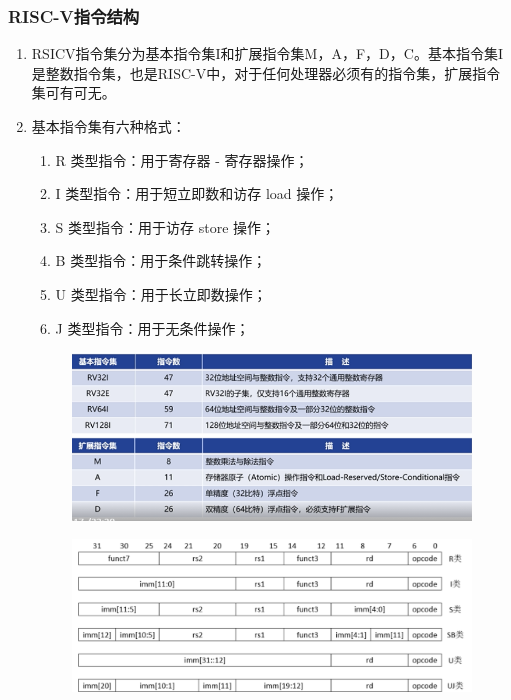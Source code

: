\documentclass[a4paper, 14pt, oneside]{book} %
\numberwithin{equation}{subsection}
\begin{document}
			\subsubsection{RISC-V指令结构}
				\begin{enumerate}
					\item 
						RSICV指令集分为基本指令集I和扩展指令集M，A，F，D，C。基本指令集I是整数指令集，也是RISC-V中，对于任何处理器必须有的指令集，扩展指令集可有可无。
					\item
						基本指令集有六种格式：
					\begin{enumerate}		
						\item 
							R 类型指令：用于寄存器 - 寄存器操作；
						\item 
							I 类型指令：用于短立即数和访存 load 操作；
						\item 
							S 类型指令：用于访存 store 操作；
						\item 
							B 类型指令：用于条件跳转操作；
						\item 
							U 类型指令：用于长立即数操作；
						\item 
							J 类型指令：用于无条件操作；
					\end{enumerate}
					\begin{figure}[!htbp]
						\centering
						\includegraphics[scale=0.8]{img/two.png}
					\end{figure}
					\begin{figure}[!htbp]
						\centering
						\includegraphics[scale=0.5]{img/three.png}
					\end{figure}
				\end{enumerate}
\end{document}
